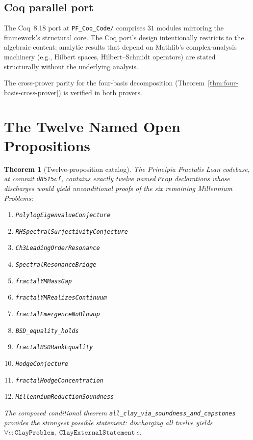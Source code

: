 \documentclass[11pt,a4paper]{article}
\newtheorem{theorem}{Theorem}[section]
\theoremstyle{definition}
\begin{document}
\subsection{Coq parallel port}

The Coq~8.18 port at \texttt{PF\_Coq\_Code/} comprises $31$ modules
mirroring the framework's structural core. The Coq port's design
intentionally restricts to the algebraic content; analytic results
that depend on Mathlib's complex-analysis machinery (e.g., Hilbert
spaces, Hilbert--Schmidt operators) are stated structurally without
the underlying analysis.

The cross-prover parity for the four-basis decomposition
(Theorem~\ref{thm:four-basis-cross-prover}) is verified
in both provers.

\section{The Twelve Named Open Propositions}

\begin{theorem}[Twelve-proposition catalog]\label{thm:twelve-props-cat}
The Principia Fractalis Lean codebase, at commit \texttt{d8515cf},
contains exactly twelve named \texttt{Prop} declarations whose
discharges would yield unconditional proofs of the six remaining
Millennium Problems:
\begin{enumerate}\itemsep0pt
\item \texttt{PolylogEigenvalueConjecture}
\item \texttt{RHSpectralSurjectivityConjecture}
\item \texttt{Ch3LeadingOrderResonance}
\item \texttt{SpectralResonanceBridge}
\item \texttt{fractalYMMassGap}
\item \texttt{fractalYMRealizesContinuum}
\item \texttt{fractalEmergenceNoBlowup}
\item \texttt{BSD\_equality\_holds}
\item \texttt{fractalBSDRankEquality}
\item \texttt{HodgeConjecture}
\item \texttt{fractalHodgeConcentration}
\item \texttt{MillenniumReductionSoundness}
\end{enumerate}
The composed conditional theorem
\texttt{all\_clay\_via\_soundness\_and\_capstones} provides the
strongest possible statement: discharging all twelve yields
\texttt{$\forall c\colon \mathtt{ClayProblem},\; \mathtt{ClayExternalStatement}\ c$}.
\end{theorem}
\end{document}
